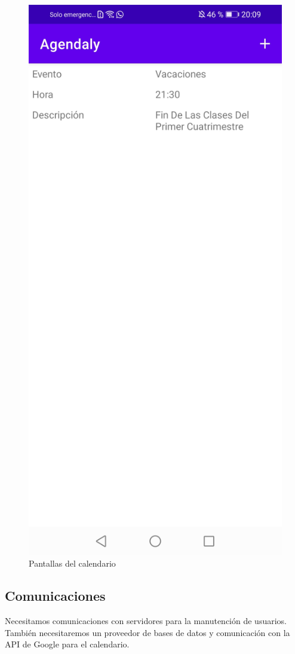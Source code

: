 \documentclass[a4paper,openright,12pt]{article}
\begin{document}
\begin{figure}
            \includegraphics[scale=0.05]{savedevent.jpg}\hfill
            \caption{Pantallas del calendario}
        \end{figure}

\subsection{Comunicaciones}
Necesitamos comunicaciones con servidores para la manutención de usuarios. También necesitaremos un proveedor de bases de datos y comunicación con la API de Google para el calendario.
\end{document}
